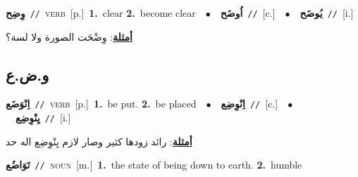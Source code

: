 \documentclass[10pt,a4paper,twoside]{article} %
\begin{document}
\begin{multicols}{2}
{\setlength\topsep{0pt}\textbf{\foreignlanguage{arabic}{وِضِح}}\ {\color{gray}\texttt{//}\color{black}}\ \textsc{verb}\ [p.]\ \textbf{1.}~clear  \textbf{2.}~become clear\ \ $\bullet$\ \ \setlength\topsep{0pt}\textbf{\foreignlanguage{arabic}{اُوضَح}}\ {\color{gray}\texttt{//}\color{black}}\ [c.]\ \ $\bullet$\ \ \setlength\topsep{0pt}\textbf{\foreignlanguage{arabic}{يُوضَح}}\ {\color{gray}\texttt{//}\color{black}}\ [i.]\  \begin{flushright}\color{gray}\foreignlanguage{arabic}{\textbf{\underline{\foreignlanguage{arabic}{أمثلة}}}: وِضْحَت الصورة ولا لسة؟}\end{flushright}\color{black}} \vspace{2mm}

\vspace{-3mm}
\subsection*{\color{blue}\foreignlanguage{arabic}{و.ض.ع}\color{blue}{}} 

{\setlength\topsep{0pt}\textbf{\foreignlanguage{arabic}{اِنْوَضَع}}\ {\color{gray}\texttt{//}\color{black}}\ \textsc{verb}\ [p.]\ \textbf{1.}~be put.  \textbf{2.}~be placed\ \ $\bullet$\ \ \setlength\topsep{0pt}\textbf{\foreignlanguage{arabic}{اِنْوِضِع}}\ {\color{gray}\texttt{//}\color{black}}\ [c.]\ \ $\bullet$\ \ \setlength\topsep{0pt}\textbf{\foreignlanguage{arabic}{يِنْوِضِع}}\ {\color{gray}\texttt{//}\color{black}}\ [i.]\  \begin{flushright}\color{gray}\foreignlanguage{arabic}{\textbf{\underline{\foreignlanguage{arabic}{أمثلة}}}: رائد زودها كثير وصار لازم يِنْوِضِع اله حد}\end{flushright}\color{black}} \vspace{2mm}

{\setlength\topsep{0pt}\textbf{\foreignlanguage{arabic}{تَوَاضُع}}\ {\color{gray}\texttt{//}\color{black}}\ \textsc{noun}\ [m.]\ \textbf{1.}~the state of being down to earth.  \textbf{2.}~humble\ } \vspace{2mm}


\end{multicols}
\end{document}
